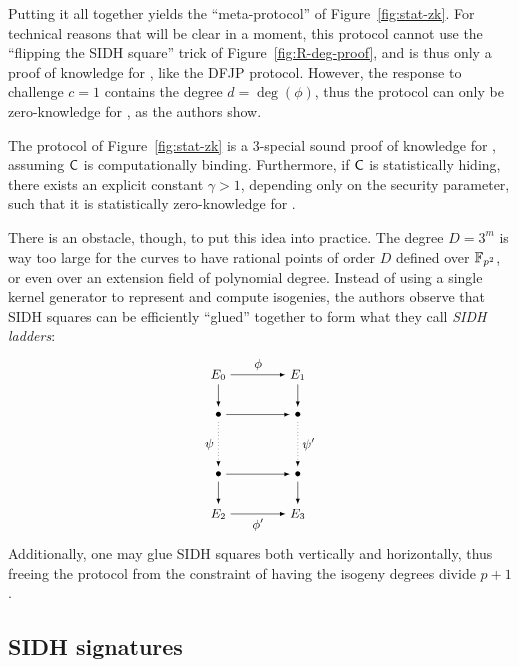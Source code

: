 Putting it all together yields the ``meta-protocol'' of
Figure~\ref{fig:stat-zk}. For technical reasons that will be clear in
a moment, this protocol cannot use the ``flipping the SIDH square''
trick of Figure~\ref{fig:R-deg-proof}, and is thus only a proof of
knowledge for \R[isog], like the DFJP protocol.  However, the response
to challenge $c=1$ contains the degree $d=\deg(\phi)$, thus the
protocol can only be zero-knowledge for \R[deg], as the authors show.

\begin{proposition}
  The protocol of Figure~\ref{fig:stat-zk} is a 3-special sound proof
  of knowledge for \R[isog], assuming $\mathsf{C}$ is computationally
  binding.  Furthermore, if $\mathsf{C}$ is statistically hiding, there
  exists an explicit constant $\gamma>1$, depending only on the
  security parameter, such that it is statistically zero-knowledge for
  \R[deg].
\end{proposition}

There is an obstacle, though, to put this idea into practice.  The
degree $D=3^m$ is way too large for the curves to have rational points
of order $D$ defined over $\mathbb{F}_{p^2}$, or even over an extension field
of polynomial degree.  Instead of using a single kernel generator to
represent and compute isogenies, the authors observe that SIDH squares
can be efficiently ``glued'' together to form what they call
\emph{SIDH ladders}:
%
\begin{equation*}
  \begin{tikzpicture}
    \small
    \node (E0) at (0,0) {$E_0$};
    \node (E1) at (2,0) {$E_1$};
    \node (Ee0) at (0,-1) {$\bullet$};
    \node (Eo0) at (2,-1) {$\bullet$};
    \node (Ee1) at (0,-2.5) {$\bullet$};
    \node (Eo1) at (2,-2.5) {$\bullet$};
    \node (E2) at (0,-3.5) {$E_2$};
    \node (E3) at (2,-3.5) {$E_3$};

    \draw[-latex]
    (E0) edge node[above] {$\phi$} (E1)
    (Ee0) edge (Eo0)
    (Ee1) edge (Eo1)
    (E2) edge node[below] {$\phi'$} (E3)
    (E0) edge (Ee0)
    (E1) edge (Eo0)
    (Ee1) edge (E2)
    (Eo1) edge (E3);
    \draw[dotted,-latex]
    (Ee0) edge node[left] {$\psi$} (Ee1)
    (Eo0) edge node[right] {$\psi'$} (Eo1);
  \end{tikzpicture}
\end{equation*}
Additionally, one may glue SIDH squares both vertically and
horizontally, thus freeing the protocol from the constraint of having
the isogeny degrees divide $p+1$.


\subsection{SIDH signatures}

